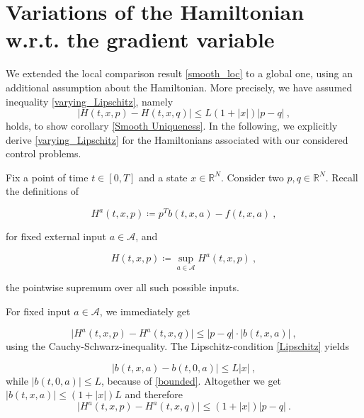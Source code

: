 \section{Variations of the Hamiltonian w.r.t. the gradient variable}
\label{Hamiltonian gradient}

We extended the local comparison result \ref{smooth_loc} to a global one, using an additional assumption about the Hamiltonian. More precisely, we have assumed inequality \eqref{varying_Lipschitz}, namely
\begin{equation*}
	\lvert H(t, x, p) - H(t, x, q) \rvert \leq L \left(1 + \lvert x \rvert \right) \lvert p - q \rvert \ ,
\end{equation*}
holds, to show corollary \ref{Smooth Uniqueness}. In the following, we explicitly derive \eqref{varying_Lipschitz} for the Hamiltonians associated with our considered control problems. 

Fix a point of time $ t \in [0, T] $ and a state $ x \in \mathbb{R}^N $. Consider two  $ p, q \in \mathbb{R}^N $. Recall the definitions of

\begin{equation*}
	H^{a}(t, x, p) \coloneqq p^{T} b(t, x, a) - f(t, x, a) \ ,
\end{equation*} 

for fixed external input $ a \in \mathcal{A} $, and 

\begin{equation*}
	H(t, x, p) \coloneqq \sup\limits_{a \in \mathcal{A}} H^{a}(t, x, p) \ ,
\end{equation*}

the pointwise supremum over all such possible inputs.

For fixed input $ a \in \mathcal{A} $, we immediately get

\begin{equation*}
	\lvert H^{a}(t, x, p) - H^{a}(t, x, q) \lvert \leq \lvert p - q \rvert \cdot \lvert b(t, x, a) \rvert \ ,
\end{equation*}
using the Cauchy-Schwarz-inequality. The Lipschitz-condition \eqref{Lipschitz} yields

\begin{equation*}
	\lvert b(t, x, a) - b(t, 0, a) \rvert \leq L \lvert x \rvert \ ,
\end{equation*}
while $ \lvert b(t, 0, a)  \rvert \leq L $, because of \eqref{bounded}. Altogether we get $ \lvert b(t, x, a) \rvert \leq (1 + \lvert x \rvert) L $ and therefore
\begin{equation}
	\label{index ineq}
	\lvert H^{a}(t, x, p) - H^{a}(t, x, q) \lvert \leq (1 + \lvert x \rvert) \lvert p - q \rvert \ .
\end{equation}

